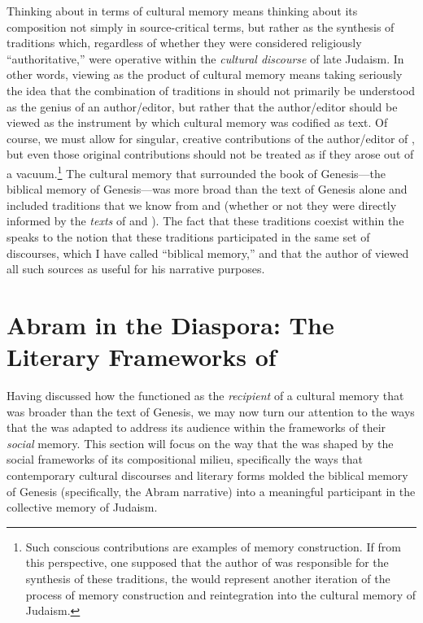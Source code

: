 Thinking about \ga in terms of cultural memory means thinking about its composition not simply in source-critical terms, but rather as the synthesis of traditions which, regardless of whether they were considered religiously ``authoritative,'' were operative within the \emph{cultural discourse} of late \secondtemple Judaism. In other words, viewing \ga as the product of cultural memory means taking seriously the idea that the combination of traditions in \ga should not primarily be understood as the genius of an author/editor, but rather that the author/editor should be viewed as the instrument by which cultural memory was codified as text. Of course, we must allow for singular, creative contributions of the author/editor of \ga, but even those original contributions should not be treated as if they arose out of a vacuum.\footnote{Such conscious contributions are examples of memory construction. If from this perspective, one supposed that the author of \ga was responsible for the synthesis of these traditions, the \ga would represent another iteration of the process of memory construction and reintegration into the cultural memory of \secondtemple Judaism.} The cultural memory that surrounded the book of Genesis---the biblical memory of Genesis---was more broad than the text of Genesis alone and included traditions that we know from \jub and \firstenoch (whether or not they were directly informed by the \emph{texts} of \jub and \firstenoch). The fact that these traditions coexist within the \ga speaks to the notion that these traditions participated in the same set of discourses, which I have called ``biblical memory,'' and that the author of \ga viewed all such sources as useful for his narrative purposes.

\section{Abram in the Diaspora: The Literary Frameworks of \GA}

Having discussed how the \ga functioned as the \emph{recipient} of a cultural memory that was broader than the text of Genesis, we may now turn our attention to the ways that the \ga was adapted to address its audience within the frameworks of their \emph{social} memory. This section will focus on the way that the \ga was shaped by the social frameworks of its compositional milieu, specifically the ways that contemporary cultural discourses and literary forms molded the biblical memory of Genesis (specifically, the Abram narrative) into a meaningful participant in the collective memory of \secondtemple Judaism.

